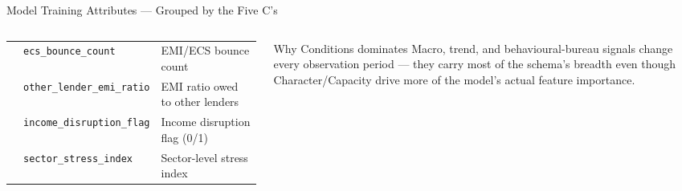 \documentclass[9pt,aspectratio=169]{beamer}
\begin{document}
\begin{frame}{Model Training Attributes --- Grouped by the Five C's}
\begin{columns}[T]
\begin{tabular}{@{}lp{2.1cm}p{2.9cm}@{}}
        & \texttt{ecs\_bounce\_count}        & EMI/ECS bounce count\\
        & \texttt{other\_lender\_emi\_ratio} & EMI ratio owed to other lenders\\
        & \texttt{income\_disruption\_flag}  & Income disruption flag (0/1)\\
        & \texttt{sector\_stress\_index}     & Sector-level stress index\\
      \bottomrule
    \end{tabular}
    \vspace{6pt}

    \begin{block}{\scriptsize Why Conditions dominates}
      \tiny
      Macro, trend, and behavioural-bureau signals change every observation period ---
      they carry most of the schema's breadth even though Character/Capacity drive
      more of the model's actual feature importance.
    \end{block}
\end{columns}
\end{frame}
\end{document}

